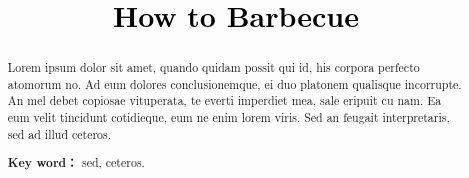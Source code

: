 \documentclass[a4paper,twoside]{article}
\newcommand{\PaperTitle}{How to Barbecue}  %
\begin{document}
	
	
	\newpage
	
	\title{
		\Large{\textcolor{black}{\PaperTitle}}
	}
	
	
	\maketitle
	
	\tableofcontents
	
	\newpage
	\thispagestyle{empty}
	
	\begin{spacing}{1.2} 
	
	\begin{abstract}
		Lorem ipsum dolor sit amet, quando quidam possit qui id, his corpora perfecto atomorum no. Ad eum dolores conclusionemque, ei duo platonem qualisque incorrupte. An mel debet copiosae vituperata, te everti imperdiet mea, sale eripuit cu nam. Ea eum velit tincidunt cotidieque, eum ne enim lorem viris. Sed an feugait interpretaris, sed ad illud ceteros. 
		
		\par\textbf{Key word：} sed, ceteros. 
		
	\end{abstract}

	\end{spacing} 
	
\end{document}
